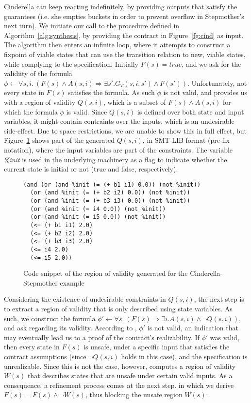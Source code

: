 Cinderella can keep reacting indefinitely, by providing outputs that satisfy the
guarantees (i.e. she empties buckets in order to prevent overflow in Stepmother's next turn).
We initiate our call to the procedure defined in Algorithm~\ref{alg:synthesis},
by providing the contract in Figure~\ref{fg:cind} as input. The algorithm
then enters an infinite loop, where it attempts to construct a fixpoint of
viable states that can use the transition relation to new, viable states,
while complying to the specification. Initially $F(s) = true$, and we ask \aeval for the validiity of the formula $\phi \gets \forall s,i. \ (F(s) \land A(s,i) \Rightarrow \exists s'.G_{T}(s,i,s') \land F(s'))$. Unfortunately, not every state in $F(s)$
satisfies the formula. As such $\phi$ is not valid, and \aeval provides us with
a region of validity $Q(s,i)$, which is a subset of $F(s) \land A(s,i)$ for
which the formula $\phi$ is valid. Since $Q(s,i)$ is defined over both state and
input variables, it might contain contraints over the inputs, which is an
undesirable side-effect. Due to space restrictions, we are unable to show this
in full effect, but Figure~\ref{fg:snippet} shows part of the generated
$Q(s,i)$, in SMT-LIB format (pre-fix notation), where the input variables are
part of the constraints. The variable \textit{\%init} is used in the underlying
machinery as a flag to indicate whether the current state is initial or not
(true and false, respectively). 

\begin{figure}[!t]
\centering
 \begin{Verbatim}[fontsize=\footnotesize]
(and (or (and %init (= (+ b1 i1) 0.0)) (not %init))
  (or (and %init (= (+ b2 i2) 0.0)) (not %init))
  (or (and %init (= (+ b3 i3) 0.0)) (not %init))
  (or (and %init (= i4 0.0)) (not %init))
  (or (and %init (= i5 0.0)) (not %init))
  (<= (+ b1 i1) 2.0)
  (<= (+ b2 i2) 2.0)
  (<= (+ b3 i3) 2.0)
  (<= i4 2.0)
  (<= i5 2.0))
 \end{Verbatim}
\caption{Code snippet of the region of validity generated for the Cinderella-Stepmother
example}
\label{fg:snippet}
\end{figure}

Considering the existence of undesirable constraints in $Q(s,i)$, the next step
is to extract a region of validity that is only described using state variables.
As such, we construct the formula $\phi' \gets \forall s. \ (F(s) \Rightarrow \exists
i. A(s,i) \land \lnot Q(s,i))$, and ask \aeval regarding its validity. According
to \aeval, $\phi'$ is not valid, an indication that may eventually lead us to a
proof of the contract's realizability. If $\phi'$ was valid, then every state in
$F(s)$ is unsafe, under a specific input that satisfies the contract
assumptions (since $\lnot Q(s,i)$ holds in this case), and the specification is unrealizable. Since this is not the case,
however, \aeval computes a region of validity $W(s)$ that describes states that are unsafe under certain valid inputs. As a consequence, a refinement process comes at the next step. in which we derive $F(s) = F(s) \land \lnot W(s)$, thus blocking the unsafe region $W(s)$.

